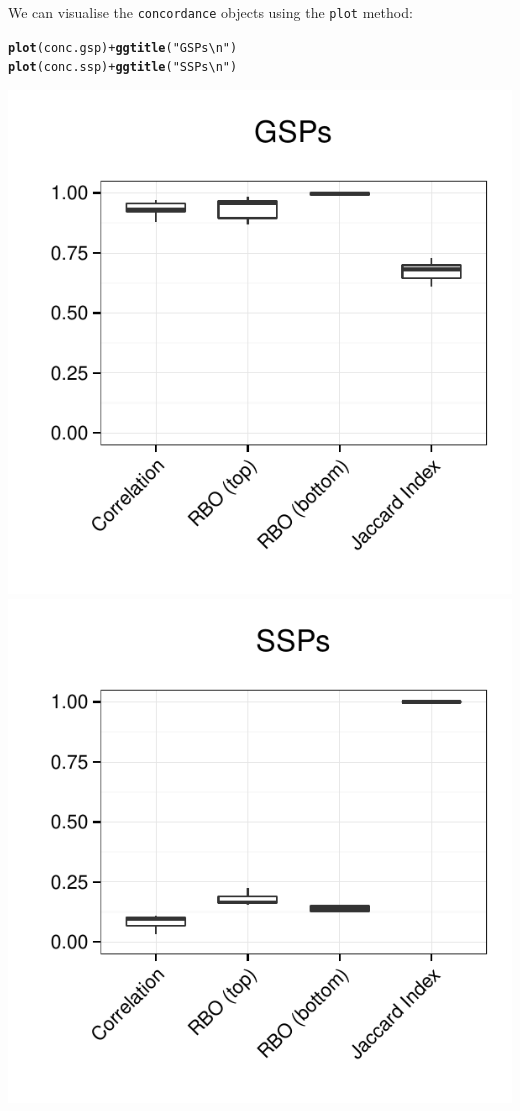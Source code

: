 \documentclass{article}\usepackage[]{graphicx}\usepackage[]{color}
\makeatletter
\newcommand{\hlstr}[1]{\textcolor[rgb]{0.192,0.494,0.8}{#1}}%
\newcommand{\hlopt}[1]{\textcolor[rgb]{0,0,0}{#1}}%
\newcommand{\hlstd}[1]{\textcolor[rgb]{0.345,0.345,0.345}{#1}}%
\newcommand{\hlkwd}[1]{\textcolor[rgb]{0.737,0.353,0.396}{\textbf{#1}}}%
\newenvironment{kframe}{%
 \def\at@end@of@kframe{}%
 \ifinner\ifhmode%
  \def\at@end@of@kframe{\end{minipage}}%
  \begin{minipage}{\columnwidth}%
 \fi\fi%
 \def\FrameCommand##1{\hskip\@totalleftmargin \hskip-\fboxsep
 \colorbox{shadecolor}{##1}\hskip-\fboxsep
     \hskip-\linewidth \hskip-\@totalleftmargin \hskip\columnwidth}%
 \MakeFramed {\advance\hsize-\width
   \@totalleftmargin\z@ \linewidth\hsize
   \@setminipage}}%
 {\par\unskip\endMakeFramed%
 \at@end@of@kframe}
\newenvironment{knitrout}{}{} %
\makeatother
\begin{document}
We can visualise the \texttt{concordance} objects using the \texttt{plot} method:
\begin{knitrout}
\color{fgcolor}\begin{kframe}
\begin{alltt}
  \hlkwd{plot}\hlstd{(conc.gsp)} \hlopt{+} \hlkwd{ggtitle}\hlstd{(}\hlstr{"GSPs\textbackslash{}n"}\hlstd{)}
  \hlkwd{plot}\hlstd{(conc.ssp)} \hlopt{+} \hlkwd{ggtitle}\hlstd{(}\hlstr{"SSPs\textbackslash{}n"}\hlstd{)}
\end{alltt}
\end{kframe}

{\centering \includegraphics[width=.45\textwidth]{tmp/gespeR-plot_concordance-1} 
\includegraphics[width=.45\textwidth]{tmp/gespeR-plot_concordance-2} 

}



\end{knitrout}
\end{document}
